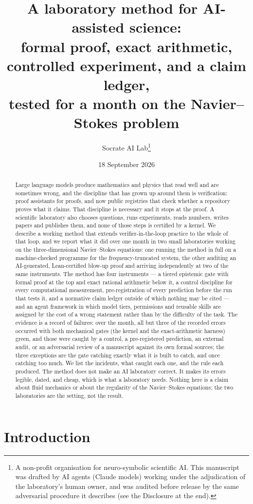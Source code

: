 \documentclass[11pt]{article}
\title{A laboratory method for AI-assisted science:\\
formal proof, exact arithmetic, controlled experiment, and a claim ledger,\\
tested for a month on the Navier--Stokes problem}
\author{Socrate AI Lab\thanks{A non-profit organisation for neuro-symbolic scientific AI.
This manuscript was drafted by AI agents (Claude models) working under the adjudication of the
laboratory's human owner, and was audited before release by the same adversarial procedure it
describes (see the Disclosure at the end).}}
\date{18 September 2026}
\begin{document}
\maketitle

\begin{abstract}
Large language models produce mathematics and physics that read well and are sometimes wrong,
and the discipline that has grown up around them is verification: proof assistants for proofs,
and now public registries that check whether a repository proves what it claims. That discipline
is necessary and it stops at the proof. A scientific laboratory also chooses questions, runs
experiments, reads numbers, writes papers and publishes them, and none of those steps is
certified by a kernel. We describe a working method that extends verifier-in-the-loop practice
to the whole of that loop, and we report what it did over one month in two small laboratories
working on the three-dimensional Navier--Stokes equations: one running the method in full on a
machine-checked programme for the frequency-truncated system, the other auditing an
AI-generated, Lean-certified blow-up proof and arriving independently at two of the same
instruments. The method has four instruments --- a tiered epistemic gate with formal proof at
the top and exact rational arithmetic below it, a control discipline for every computational
measurement, pre-registration of every prediction before the run that tests it, and a normative
claim ledger outside of which nothing may be cited --- and an agent framework in which model
tiers, permissions and reusable skills are assigned by the cost of a wrong statement rather than
by the difficulty of the task. The evidence is a record of failures: over the month, all but three of
the recorded errors occurred with both mechanical gates (the kernel and the exact-arithmetic
harness) green, and those were caught by a
control, a pre-registered prediction, an external audit, or an adversarial review of a
manuscript against its own formal sources; the three exceptions are the gate catching exactly
what it is built to catch, and once catching too much. We list the incidents, what caught each
one, and the rule each produced. The method does not make an AI laboratory correct. It makes
its errors legible, dated, and cheap, which is what a laboratory needs. Nothing here is a claim
about fluid mechanics or about the regularity of the Navier--Stokes equations; the two
laboratories are the setting, not the result.
\end{abstract}

\section{Introduction}
\label{sec:intro}
\end{document}
